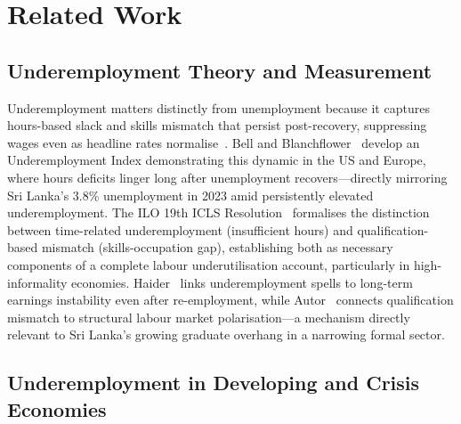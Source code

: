 \documentclass[sigconf]{acmart}
\begin{document}
\section{Related Work}

\subsection{Underemployment Theory and Measurement}

Underemployment matters distinctly from unemployment because
it captures hours-based slack and skills mismatch that persist post-recovery,
suppressing wages even as headline rates normalise~\cite{bell2018underemployment,ilo2013}.
Bell and Blanchflower~\cite{bell2018underemployment} develop an Underemployment Index
demonstrating this dynamic in the US and Europe, where hours
deficits linger long after unemployment recovers---directly mirroring
Sri Lanka's 3.8\% unemployment in 2023 amid persistently
elevated underemployment. The ILO 19th ICLS Resolution~\cite{ilo2013} formalises
the distinction between time-related underemployment (insufficient hours)
and qualification-based mismatch (skills-occupation gap), establishing
both as necessary components of a complete labour underutilisation account,
particularly in high-informality economies.
Haider~\cite{haider2001} links underemployment spells to long-term
earnings instability even after re-employment, while
Autor~\cite{autor2014} connects qualification mismatch to structural
labour market polarisation---a mechanism directly relevant to Sri Lanka's
growing graduate overhang in a narrowing formal sector.

\subsection{Underemployment in Developing and Crisis Economies}
\end{document}
